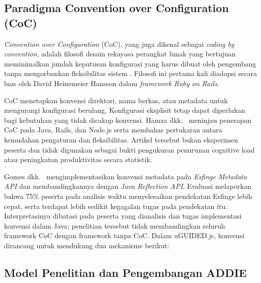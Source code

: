\documentclass[12pt,a4paper,oneside]{report}
\begin{document}
\subsection{Paradigma Convention over Configuration (CoC)}

\textit{Convention over Configuration} (CoC), yang juga dikenal sebagai \textit{coding by convention}, adalah filosofi desain rekayasa perangkat lunak yang bertujuan meminimalkan jumlah keputusan konfigurasi yang harus dibuat oleh pengembang tanpa mengorbankan fleksibilitas sistem \cite{hansson2011agile}. Filosofi ini pertama kali diadopsi secara luas oleh David Heinemeier Hansson dalam \textit{framework} \textit{Ruby on Rails}.

CoC menetapkan konvensi direktori, nama berkas, atau metadata untuk mengurangi konfigurasi berulang. Konfigurasi eksplisit tetap dapat diperlukan bagi kebutuhan yang tidak dicakup konvensi. Hamza dkk.\ \cite{ijres2023coc} meninjau penerapan CoC pada Java, Rails, dan Node.js serta membahas pertukaran antara kemudahan pengaturan dan fleksibilitas. Artikel tersebut bukan eksperimen peserta dan tidak digunakan sebagai bukti pengukuran penurunan cognitive load atau peningkatan produktivitas secara statistik.

Gomes dkk.\ \cite{esfinge2025coc} mengimplementasikan konvensi metadata pada \textit{Esfinge Metadata API} dan membandingkannya dengan \textit{Java Reflection API}. Evaluasi melaporkan bahwa 75\% peserta pada analisis waktu menyelesaikan pendekatan Esfinge lebih cepat, serta terdapat lebih sedikit kegagalan tugas pada pendekatan itu. Interpretasinya dibatasi pada peserta yang dianalisis dan tugas implementasi konvensi dalam Java; penelitian tersebut tidak membandingkan seluruh framework CoC dengan framework tanpa CoC. Dalam uGUIDED.js, konvensi dirancang untuk mendukung dua mekanisme berikut:

\subsection{Model Penelitian dan Pengembangan ADDIE}
\end{document}
